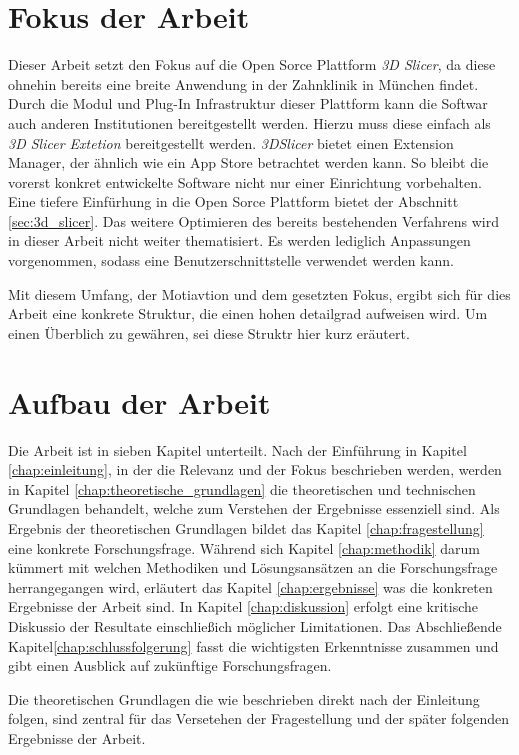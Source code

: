 \section{Fokus der Arbeit}
\label{sec:fokus_der-arbeit} Dieser Arbeit setzt den Fokus auf die Open Sorce
Plattform \textit{3D Slicer}, da diese ohnehin bereits eine breite Anwendung in
der Zahnklinik in München findet. Durch die Modul und Plug-In Infrastruktur dieser
Plattform kann die Softwar auch anderen Institutionen bereitgestellt werden.
Hierzu muss diese einfach als \textit{3D Slicer Extetion} bereitgestellt werden.
\textit{3DSlicer} bietet einen Extension Manager, der ähnlich wie ein App Store
betrachtet werden kann. So bleibt die vorerst konkret entwickelte Software nicht
nur einer Einrichtung vorbehalten. Eine tiefere Einfürhung in die Open Sorce
Plattform bietet der Abschnitt \ref{sec:3d_slicer}. Das weitere Optimieren des bereits
bestehenden Verfahrens wird in dieser Arbeit nicht weiter thematisiert. Es
werden lediglich Anpassungen vorgenommen, sodass eine Benutzerschnittstelle verwendet
werden kann.

Mit diesem Umfang, der Motiavtion und dem gesetzten Fokus, ergibt sich für dies Arbeit
eine konkrete Struktur, die einen hohen detailgrad aufweisen wird. Um einen Überblich
zu gewähren, sei diese Struktr hier kurz eräutert.

\section{Aufbau der Arbeit}
\label{sec:aufbau_der_arbeit} Die Arbeit ist in sieben Kapitel unterteilt. Nach der
Einführung in Kapitel \ref{chap:einleitung}, in der die Relevanz und der Fokus
beschrieben werden, werden in Kapitel \ref{chap:theoretische_grundlagen} die theoretischen
und technischen Grundlagen behandelt, welche zum Verstehen der Ergebnisse
essenziell sind. Als Ergebnis der theoretischen Grundlagen bildet das Kapitel \ref{chap:fragestellung}
eine konkrete Forschungsfrage. Während sich Kapitel \ref{chap:methodik} darum
kümmert mit welchen Methodiken und Lösungsansätzen an die Forschungsfrage
herrangegangen wird, erläutert das Kapitel \ref{chap:ergebnisse} was die konkreten
Ergebnisse der Arbeit sind. In Kapitel \ref{chap:diskussion} erfolgt eine
kritische Diskussio der Resultate einschließich möglicher Limitationen. Das Abschließende
Kapitel\ref{chap:schlussfolgerung} fasst die wichtigsten Erkenntnisse zusammen
und gibt einen Ausblick auf zukünftige Forschungsfragen.

Die theoretischen Grundlagen die wie beschrieben direkt nach der Einleitung
folgen, sind zentral für das Versetehen der Fragestellung und der später folgenden
Ergebnisse der Arbeit.
